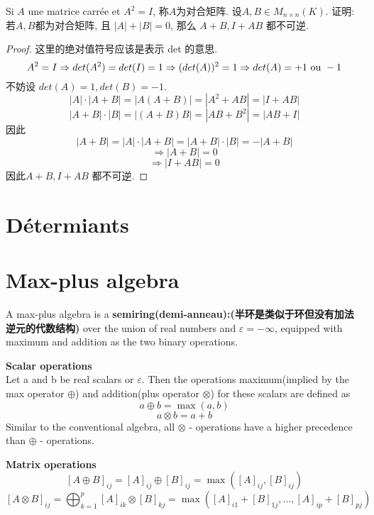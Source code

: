 \documentclass{book}
\begin{document}
\begin{question}
Si $A$ une matrice carr\'ee et $A^2 = I$, 称$A$为对合矩阵. 设$A, B \in M_{n \times n}(K)$.
证明: 若$A, B$都为对合矩阵, 且 $|A| + |B| = 0$, 那么 $A + B, I + AB$ 都不可逆. \\
\end{question}
\begin{proof}
这里的绝对值符号应该是表示 det 的意思.
$$
A^2 = I
\Rightarrow det(A^2) = det(I) = 1
\Rightarrow (det(A))^2 = 1
\Rightarrow det(A) = +1 \textrm{ ou } -1
$$
不妨设 $det(A) = 1, det(B) = -1$.
$$|A| \cdot |A + B| = |A(A + B)| = |A^2 + AB| = |I + AB|$$
$$|A + B| \cdot |B| = |(A + B)B| = |AB + B^2| = |AB + I|$$
因此 $$|A + B| = |A| \cdot |A + B| = |A + B| \cdot |B| = -|A + B|$$
$$\Rightarrow |A + B| = 0$$
$$\Rightarrow |I + AB| = 0$$
因此$A + B, I + AB$ 都不可逆.
\end{proof}

\chapter{D\'etermiants}

\chapter{Max-plus algebra}
A max-plus algebra is a \textbf{semiring(demi-anneau):(半环是类似于环但没有加法逆元的代数结构)} over the union of real numbers and
$\varepsilon = -\infty$, equipped with maximum and addition as the two binary operations.

\textbf{Scalar operations}\\
Let a and b be real scalars or $\varepsilon$.
Then the operations maximum(implied by the max operator $\oplus$) and addition(plus operator $\otimes$) for these scalars are defined as
$$ a \oplus b = \max(a,b) $$
$$ a \otimes b = a + b $$
Similar to the conventional algebra, all $\otimes$ - operations have a higher precedence than $\oplus$ - operations.

\textbf{Matrix operations}\\
$$ [A \oplus B]_{ij} = [A]_{ij} \oplus [B]_{ij} = \max([A]_{ij} , [B]_{ij}) $$
$$ [A \otimes B]_{ij} = \bigoplus_{k = 1}^p [A]_{ik} \otimes [B]_{kj} = \max([A]_{i1} + [B]_{1j}, \dots, [A]_{ip} + [B]_{pj}) $$
\end{document}
